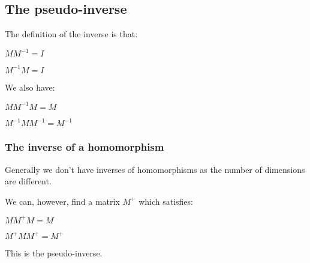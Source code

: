 
\subsection{The pseudo-inverse}

The definition of the inverse  is that:

\(MM^{-1}=I\)

\(M^{-1}M=I\)

We also have:

\(MM^{-1}M=M\)

\(M^{-1}MM^{-1}=M^{-1}\)

\subsubsection{The inverse of a homomorphism}

Generally we don't have inverses of homomorphisms as the number of dimensions are different.

We can, however, find a matrix \(M^+\) which satisfies:

\(MM^+M=M\)

\(M^+MM^+=M^+\)

This is the pseudo-inverse.

